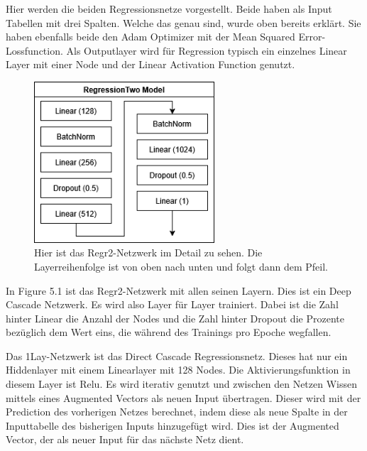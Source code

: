 Hier werden die beiden Regressionsnetze vorgestellt. Beide haben als Input Tabellen mit drei Spalten. 
Welche das genau sind, wurde oben bereits erklärt. Sie haben ebenfalls beide den Adam Optimizer mit der Mean Squared Error-Lossfunction. 
Als Outputlayer wird für Regression typisch ein einzelnes Linear Layer mit einer Node und der Linear Activation Function genutzt. 

\begin{figure}[htpb]
    \centering
    \includegraphics[height=6cm]{../../Graphiken/regressiontwo_2.png}
    \caption{\label{fig:regr2} 
    \small{Hier ist das Regr2-Netzwerk im Detail zu sehen. Die Layerreihenfolge ist von oben nach unten und folgt dann dem Pfeil. }}
\end{figure}

In Figure 5.1 ist das Regr2-Netzwerk mit allen seinen Layern. Dies ist ein Deep Cascade Netzwerk. Es wird also Layer für Layer trainiert. 
Dabei ist die Zahl hinter Linear die Anzahl der Nodes und die Zahl hinter 
Dropout die Prozente bezüglich dem Wert eins, die während des Trainings pro Epoche wegfallen. 

Das 1Lay-Netzwerk ist das Direct Cascade Regressionsnetz. Dieses hat nur ein Hiddenlayer mit einem Linearlayer mit 128 Nodes. Die 
Aktivierungsfunktion in diesem Layer ist Relu. Es wird iterativ genutzt und zwischen den Netzen Wissen mittels eines Augmented Vectors als 
neuen Input übertragen. 
Dieser wird mit der Prediction des vorherigen Netzes berechnet, indem diese als neue Spalte in der Inputtabelle des bisherigen Inputs hinzugefügt 
wird. Dies ist der Augmented Vector, der als neuer Input für das nächste Netz dient. 
